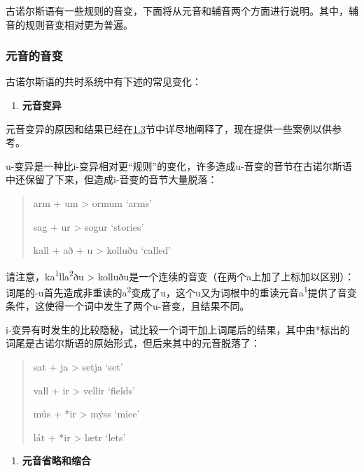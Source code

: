 古诺尔斯语有一些规则的音变，下面将从元音和辅音两个方面进行说明。其中，辅音的规则音变相对更为普遍。

\subsubsection{元音的音变}\label{ux5143ux97f3ux7684ux97f3ux53d8}

古诺尔斯语的共时系统中有下述的常见变化：

\begin{enumerate}
\def\labelenumi{\Alph{enumi}.}
\item
  \label{_Ref117017033}{}\textbf{元音变异}
\end{enumerate}

元音变异的原因和结果已经在\hyperref[ux53d8ux5143ux97f3]{1.3}节中详尽地阐释了，现在提供一些案例以供参考。

u-变异是一种比i-变异相对更``规则''的变化，许多造成u-音变的音节在古诺尔斯语中还保留了下来，但造成i-音变的音节大量脱落：

\begin{quote}
arm + um \textgreater{} ormum `arms'

sag + ur \textgreater{} sogur `stories'

kall + að + u \textgreater{} kolluðu `called'
\end{quote}

请注意，ka\textsuperscript{1}lla\textsuperscript{2}ðu \textgreater{}
kolluðu是一个连续的音变（在两个a上加了上标加以区别）：词尾的-u首先造成非重读的a\textsuperscript{2}变成了u，这个u又为词根中的重读元音a\textsuperscript{1}提供了音变条件，这使得一个词中发生了两个u-音变，且结果不同。

i-变异有时发生的比较隐秘，试比较一个词干加上词尾后的结果，其中由*标出的词尾是古诺尔斯语的原始形式，但后来其中的元音脱落了：

\begin{quote}
sat + ja \textgreater{} setja `set'

vall + ir \textgreater{} vellir `fields'

mús + *ir \textgreater{} mýss `mice'

lát + *ir \textgreater{} lætr `lets'
\end{quote}

\begin{enumerate}
\def\labelenumi{\Alph{enumi}.}
\setcounter{enumi}{1}
\item
  \label{_Ref115693879}{}\textbf{元音省略和缩合}
\end{enumerate}

